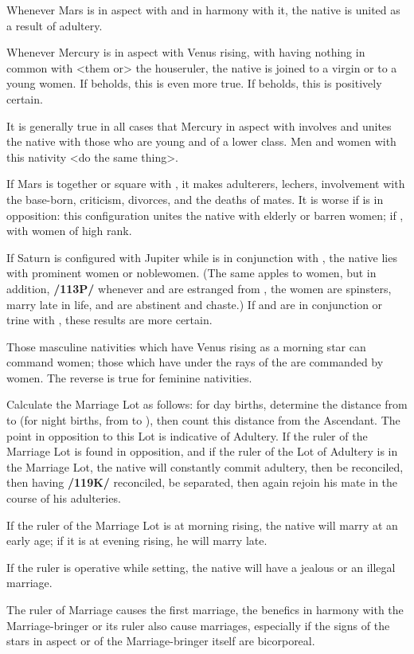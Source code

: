 Whenever Mars is in aspect with \Venus\xspace and in harmony with it, the native is united as a result of adultery. 

Whenever Mercury is in aspect with Venus rising, with \Saturn\xspace having nothing in common with <them or> the houseruler, the native is joined to a virgin or to a young women. If \Mars\xspace beholds, this is even more true. If \Jupiter\xspace beholds, this is positively certain. 

It is generally true in all cases that Mercury in aspect with \Venus\xspace involves and unites the native with those who are young and of a lower class. Men and women with this nativity <do the same thing>. 

If Mars is together or square with \Venus, it makes
adulterers, lechers, involvement with the base-born, criticism, divorces, and the deaths of mates. It is worse if \Saturn\xspace is in opposition: this configuration unites the native with elderly or barren women; if \Jupiter\xspace <is in opposition>, with women of high rank. 

If Saturn is configured with Jupiter while \Jupiter\xspace is in conjunction with \Venus, the native lies with prominent women or noblewomen. (The same apples to
women, but in addition, \textbf{/113P/} whenever \Mars\xspace and \Mercury\xspace are estranged from \Venus, the women are
spinsters, marry late in life, and are abstinent and chaste.) 
If \Saturn\xspace and \Jupiter\xspace are in conjunction or trine with \Venus, these results are more certain. 

Those masculine nativities which have Venus rising as a morning star can command women; those which have \Venus\xspace under the rays of the \Sun\xspace are commanded by women. The reverse is true for feminine nativities.

Calculate the Marriage Lot as follows: for day births, determine the distance from \Jupiter\xspace to \Venus\xspace (for night births, from \Venus\xspace to \Jupiter), then count this distance from the Ascendant. The point in opposition to this Lot is indicative of Adultery. If the ruler of the Marriage Lot is found in opposition, and if the ruler of the Lot of Adultery is in the Marriage Lot, the native will constantly commit adultery, then be reconciled, then having \textbf{/119K/} reconciled, be separated, then again rejoin his mate in the course of his adulteries. 

If the ruler of the Marriage Lot is at morning rising, the native will marry at an early age; if it is at evening rising, he will marry late. 

If the ruler is operative while setting, the native will have a jealous or an illegal marriage. 

The ruler of Marriage causes the first marriage, the benefics in harmony with the Marriage-bringer or its ruler also cause marriages, especially if the signs of the stars in aspect or of the Marriage-bringer itself are bicorporeal.


\newpage